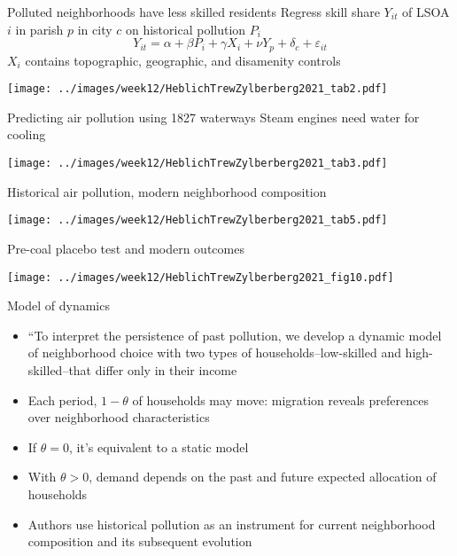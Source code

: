 \documentclass[11pt,notes=hide,aspectratio=169]{beamer}
\begin{document}
\begin{frame}{Polluted neighborhoods have less skilled residents}
Regress skill share $Y_{it}$ of LSOA $i$ in parish $p$ in city $c$ on historical pollution $P_i$
\begin{equation*}
Y_{it} = \alpha + \beta P_{i} + \gamma X_{i} + \nu Y_p + \delta_{c} + \varepsilon_{it}
\end{equation*}
$X_i$ contains topographic, geographic, and disamenity controls
\begin{center}
\texttt{[image: ../images/week12/HeblichTrewZylberberg2021\_tab2.pdf]}
\end{center}
\end{frame}
\begin{frame}{Predicting air pollution using 1827 waterways}
Steam engines need water for cooling
\begin{center}
\texttt{[image: ../images/week12/HeblichTrewZylberberg2021\_tab3.pdf]}
\end{center}
\end{frame}
\begin{frame}{Historical air pollution, modern neighborhood composition}
\begin{center}
\texttt{[image: ../images/week12/HeblichTrewZylberberg2021\_tab5.pdf]}
\end{center}
\end{frame}
\begin{frame}{Pre-coal placebo test and modern outcomes}
\begin{center}
\texttt{[image: ../images/week12/HeblichTrewZylberberg2021\_fig10.pdf]}
\end{center}
\end{frame}
\begin{frame}{Model of dynamics}
\begin{itemize}
\item ``To interpret the persistence of past pollution, we develop a dynamic model of neighborhood choice with two types of households--low-skilled and high-skilled--that differ only in their income
\item Each period, $1-\theta$ of households may move: migration reveals preferences over neighborhood characteristics
\item If $\theta = 0$, it's equivalent to a static model
\item With $\theta > 0$, demand depends on the past and future expected allocation of households
\item Authors use historical pollution as an instrument for current neighborhood composition and its subsequent evolution
\end{itemize}
\end{frame}
\end{document}

